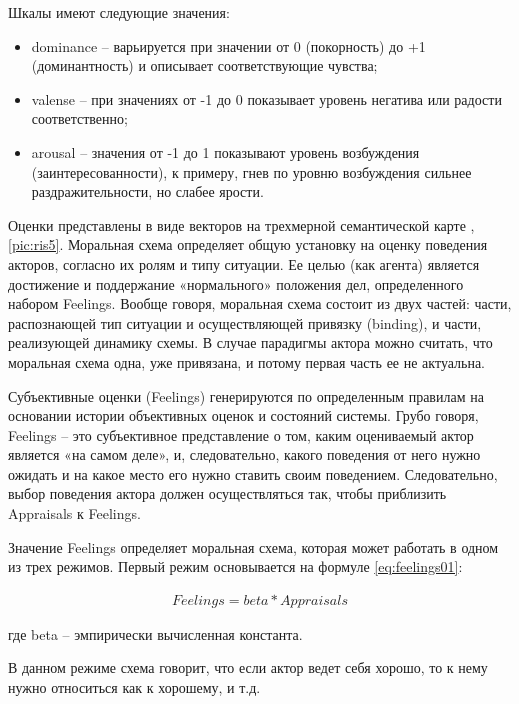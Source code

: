 Шкалы имеют следующие значения:
\begin{itemize}
  \item dominance – варьируется при значении от 0 (покорность) до +1 (доминантность) и описывает соответствующие чувства; 
  \item valense – при значениях от -1 до 0 показывает уровень негатива или радости соответственно; 
  \item arousal – значения от -1 до 1 показывают уровень возбуждения (заинтересованности), к примеру, гнев по уровню возбуждения сильнее раздражительности, но слабее ярости. 
\end{itemize}

Оценки представлены в виде векторов на трехмерной семантической карте \cite{seman_karta}, \ref{pic:ris5}.
Моральная схема определяет общую установку на оценку поведения акторов, согласно их ролям и типу ситуации. 
Ее целью (как агента) является достижение и поддержание «нормального» положения дел, определенного набором Feelings. 
Вообще говоря, моральная схема состоит из двух частей: части, распознающей тип ситуации и осуществляющей привязку (binding),
и части, реализующей динамику схемы. В случае парадигмы актора можно считать, что моральная схема одна, уже привязана, и 
потому первая часть ее не актуальна.

Субъективные оценки (Feelings) генерируются по определенным правилам на основании истории объективных оценок и состояний системы. 
Грубо говоря, Feelings – это субъективное представление о том, каким оцениваемый актор является «на самом деле», и, следовательно, 
какого поведения от него нужно ожидать и на какое место его нужно ставить своим поведением. Следовательно, выбор поведения актора 
должен осуществляться так, чтобы приблизить Appraisals к Feelings. 

Значение Feelings определяет моральная схема, которая может работать в одном из трех режимов. 
Первый режим основывается на формуле \ref{eq:feelings01}:

\begin{equation}
  \begin{gathered}
    Feelings=beta*Appraisals
  \end{gathered}
  \label{eq:feelings01}
\end{equation}

где beta – эмпирически вычисленная константа. 

В данном режиме схема говорит, что если актор ведет себя хорошо, то к нему нужно относиться как к хорошему, и т.д. 

